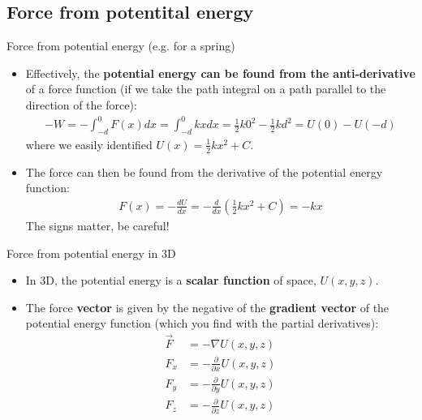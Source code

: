 \documentclass[aspectratio=169,
hyperref={colorlinks,urlcolor=blue}
]{beamer}
\begin{document}
\subsection{Force from potentital energy}
\label{subsec:forcefrompotentialenergy}
\begin{frame}{Force from potential energy (e.g. for a spring)}
\begin{itemize}
\item Effectively, the \textbf{potential energy can be found from the anti-derivative} of a force function (if we take the path integral on a path parallel to the direction of the force):
\begin{align*}
-W=-\int_{-d}^0 F(x) dx=\int_{-d}^0 kxdx=\frac{1}{2}k0^2-\frac{1}{2}kd^2=U(0)-U(-d)
\end{align*}
where we easily identified $U(x)=\frac{1}{2}kx^2+C$.
\item The force can then be found from the derivative of the potential energy function:
\begin{align*}
F(x)=-\frac{dU}{dx}=-\frac{d}{dx}\left(\frac{1}{2}kx^2+C\right)=-kx
\end{align*}
The signs matter, be careful!
\end{itemize}
\end{frame}


\begin{frame}{Force from potential energy in 3D}
\begin{itemize}
\item In 3D, the potential energy is a \textbf{scalar function} of space, $U(x,y,z)$. 
\item The force \textbf{vector} is given by the negative of the \textbf{gradient vector} of the potential energy function (which you find with the partial derivatives):
\begin{align*}
\vec F &= -\nabla U(x,y,z)\\
F_x&=-\frac{\partial}{\partial x}U(x,y,z)\\
F_y&=-\frac{\partial}{\partial y}U(x,y,z)\\
F_z&=-\frac{\partial}{\partial z}U(x,y,z)
\end{align*}
\end{itemize}
\end{frame}


\end{document}
